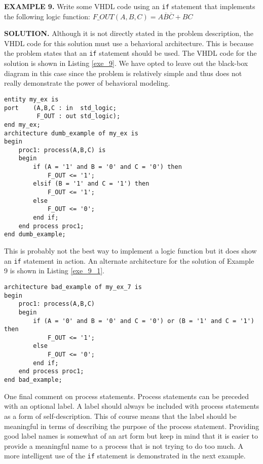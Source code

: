 \begin{leftbar}
\noindent
\textbf{EXAMPLE 9.}
Write some VHDL code  using an \texttt{if} statement that implements the following logic function: 
$F\_OUT(A,B,C)=A\overline{B}\overline{C}+BC$
\end{leftbar}
\noindent
\textbf{SOLUTION.} Although it is not directly stated in the problem description, the VHDL code for this solution must use a behavioral architecture. This is because the problem states that an \texttt{if} statement should be used. The VHDL code for the solution is shown in Listing \ref{exe_9}. We have opted to leave out the black-box diagram in this case since the problem is relatively simple and thus does not really demonstrate the power of behavioral modeling.
\null\newpage
\begin{lstlisting}[label=exe_9, caption=Solution to Example 9.]
entity my_ex is
port 	(A,B,C : in  std_logic;
	 	 F_OUT : out std_logic);
end my_ex;
architecture dumb_example of my_ex is
begin
	proc1: process(A,B,C) is
	begin
		if (A = '1' and B = '0' and C = '0') then
	   		F_OUT <= '1';
		elsif (B = '1' and C = '1') then
	   		F_OUT <= '1';
		else
	   		F_OUT <= '0';
		end if;
	end process proc1;
end dumb_example;
\end{lstlisting}
This is probably not the best way to implement a logic function but it does show an \texttt{if} statement in action. An alternate architecture for the solution of Example 9 is shown in Listing \ref{exe_9_1}.
\begin{lstlisting}[label=exe_9_1, caption=Alternative solution to Example 9.]
architecture bad_example of my_ex_7 is
begin
	proc1: process(A,B,C)
	begin
		if (A = '0' and B = '0' and C = '0') or (B = '1' and C = '1') then
	   		F_OUT <= '1';
		else
	   		F_OUT <= '0';
		end if;
	end process proc1;
end bad_example;
\end{lstlisting}
One final comment on process statements. Process statements can be preceded with an optional label. A label should always be included with process statements as a form of self-description. This of course means that the label should be meaningful in terms of describing the purpose of the process statement. Providing good label names is somewhat of an art form but keep in mind that it is easier to provide a meaningful name to a process that is not trying to do too much. A more intelligent use of the \texttt{if} statement is demonstrated in the next example.

